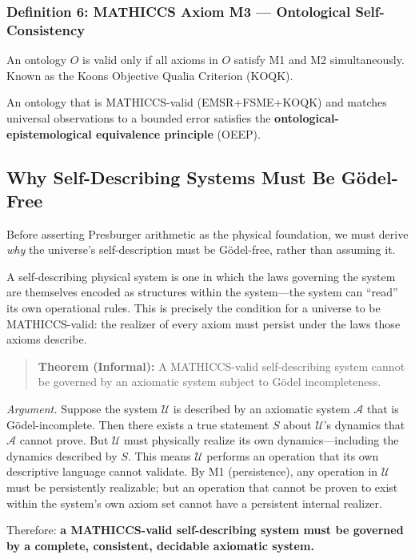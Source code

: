 \documentclass[11pt,a4paper]{article}
\begin{document}
\subsubsection{Definition 6: MATHICCS Axiom M3 --- Ontological Self-Consistency}
An ontology $O$ is valid only if all axioms in $O$ satisfy M1 and M2
simultaneously. Known as the Koons Objective Qualia Criterion (KOQK).

An ontology that is MATHICCS-valid (EMSR+FSME+KOQK) and matches universal
observations to a bounded error satisfies the \textbf{ontological-epistemological
equivalence principle} (OEEP).

\subsection{Why Self-Describing Systems Must Be G\"odel-Free}

Before asserting Presburger arithmetic as the physical foundation, we must derive
\emph{why} the universe's self-description must be G\"odel-free, rather than
assuming it.

A self-describing physical system is one in which the laws governing the system
are themselves encoded as structures within the system---the system can ``read''
its own operational rules. This is precisely the condition for a universe to be
MATHICCS-valid: the realizer of every axiom must persist under the laws those
axioms describe.

\begin{quote}
\textbf{Theorem (Informal):} A MATHICCS-valid self-describing system cannot be
governed by an axiomatic system subject to G\"odel incompleteness.
\end{quote}

\textit{Argument.} Suppose the system $\mathcal{U}$ is described by an axiomatic
system $\mathcal{A}$ that is G\"odel-incomplete. Then there exists a true statement
$S$ about $\mathcal{U}$'s dynamics that $\mathcal{A}$ cannot prove. But
$\mathcal{U}$ must physically realize its own dynamics---including the dynamics
described by $S$. This means $\mathcal{U}$ performs an operation that its own
descriptive language cannot validate. By M1 (persistence), any operation in
$\mathcal{U}$ must be persistently realizable; but an operation that cannot be
proven to exist within the system's own axiom set cannot have a persistent internal
realizer.

Therefore: \textbf{a MATHICCS-valid self-describing system must be governed by a
complete, consistent, decidable axiomatic system.}
\end{document}
